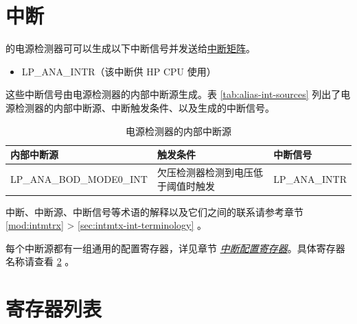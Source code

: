 \documentclass[main\_\_CN.tex]{subfiles}
\begin{document}

\section{中断}

\chipname{} 的电源检测器可可以生成以下中断信号并发送给\hyperref[mod:intmtrx]{中断矩阵}。

    \begin{itemize}
        \item LP\_ANA\_INTR（该中断供 HP CPU 使用）
    \end{itemize}

这些中断信号由电源检测器的内部中断源生成。表 \ref{tab:alias-int-sources} 列出了电源检测器的内部中断源、中断触发条件、以及生成的中断信号。

\begin{longtable}{ |l | l | l | }
\caption{电源检测器的内部中断源} \label{tab:alias-int-sources}
\\ \hline
\rowcolor{lightgray}
\textbf{内部中断源} & \textbf{触发条件}  &  \textbf{中断信号}\\ \hline
\label{int:LPANABODMODE0INT}LP\_ANA\_BOD\_MODE0\_INT  & 欠压检测器检测到电压低于阈值时触发  & LP\_ANA\_INTR  \\ \hline

\end{longtable}

\begin{tiplisting}
中断、中断源、中断信号等术语的解释以及它们之间的联系请参考章节 \ref{mod:intmtrx} \textit{} > \ref{sec:intmtx-int-terminology} \textit{}。
\end{tiplisting}


每个中断源都有一组通用的配置寄存器，详见章节 \hyperref[interrupt-config-registers]{\textit{中断配置寄存器}}。具体寄存器名称请查看 \ref{sec:psdet-reg-summ} \textit{}。




\newpage
\hypertarget{psdet-reg-summ}{}
\section{寄存器列表}
\label{sec:psdet-reg-summ}
\end{document}
